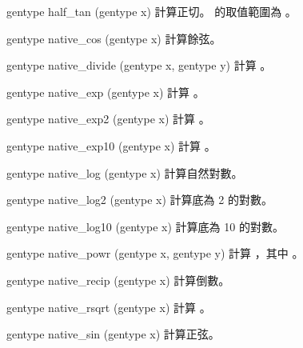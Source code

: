 gentype half_tan (gentype x)
\stopbuffer
{}
計算正切。  的取值範圍為 。
\stopbuffer

gentype native_cos (gentype x) 
\stopbuffer
{}
計算餘弦。
\stopbuffer

gentype native_divide (gentype x, 
		gentype y) 
\stopbuffer
{}
計算 。
\stopbuffer

gentype native_exp (gentype x) 
\stopbuffer
{}
計算 。
\stopbuffer

gentype native_exp2 (gentype x) 
\stopbuffer
{}
計算 。
\stopbuffer

gentype native_exp10 (gentype x) 
\stopbuffer
{}
計算 。
\stopbuffer

gentype native_log (gentype x) 
\stopbuffer
{}
計算自然對數。
\stopbuffer

gentype native_log2 (gentype x) 
\stopbuffer
{}
計算底為 2 的對數。
\stopbuffer

gentype native_log10 (gentype x) 
\stopbuffer
{}
計算底為 10 的對數。
\stopbuffer

gentype native_powr (gentype x,
		gentype y)
\stopbuffer
{}
計算 ，其中 。
\stopbuffer

gentype native_recip (gentype x)
\stopbuffer
{}
計算倒數。
\stopbuffer

gentype native_rsqrt (gentype x)
\stopbuffer
{}
計算 。
\stopbuffer

gentype native_sin (gentype x)
\stopbuffer
{}
計算正弦。
\stopbuffer

